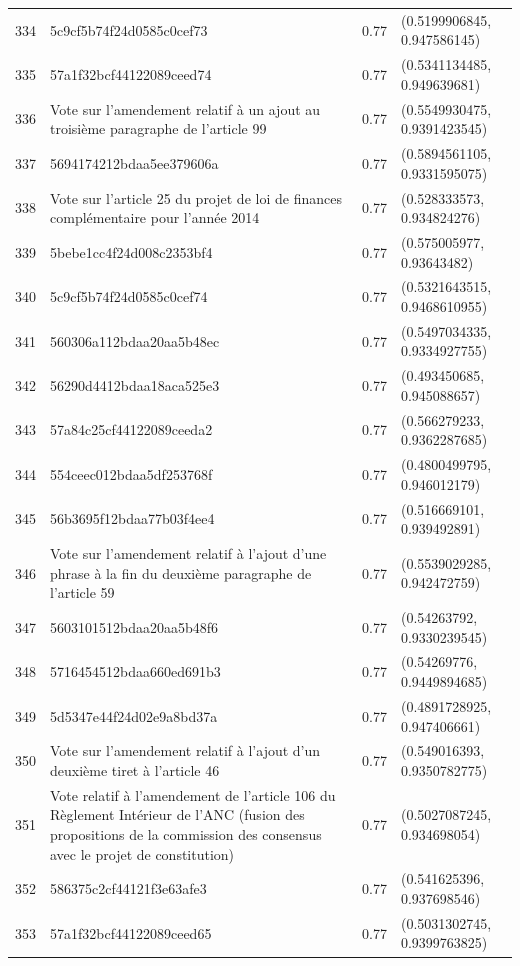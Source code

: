 \begin{table}[ht]
\begin{tabular}{rlrl}
  334 & 5c9cf5b74f24d0585c0cef73 & 0.77 & (0.5199906845, 0.947586145) \\ 
  335 & 57a1f32bcf44122089ceed74 & 0.77 & (0.5341134485, 0.949639681) \\ 
  336 & Vote sur l'amendement relatif à un ajout au troisième paragraphe de l'article 99 & 0.77 & (0.5549930475, 0.9391423545) \\ 
  337 & 5694174212bdaa5ee379606a & 0.77 & (0.5894561105, 0.9331595075) \\ 
  338 & Vote sur l'article 25 du projet de loi de finances complémentaire pour l'année 2014 & 0.77 & (0.528333573, 0.934824276) \\ 
  339 & 5bebe1cc4f24d008c2353bf4 & 0.77 & (0.575005977, 0.93643482) \\ 
  340 & 5c9cf5b74f24d0585c0cef74 & 0.77 & (0.5321643515, 0.9468610955) \\ 
  341 & 560306a112bdaa20aa5b48ec & 0.77 & (0.5497034335, 0.9334927755) \\ 
  342 & 56290d4412bdaa18aca525e3 & 0.77 & (0.493450685, 0.945088657) \\ 
  343 & 57a84c25cf44122089ceeda2 & 0.77 & (0.566279233, 0.9362287685) \\ 
  344 & 554ceec012bdaa5df253768f & 0.77 & (0.4800499795, 0.946012179) \\ 
  345 & 56b3695f12bdaa77b03f4ee4 & 0.77 & (0.516669101, 0.939492891) \\ 
  346 & Vote sur l'amendement relatif à l'ajout d'une phrase à la fin du deuxième paragraphe de l'article 59 & 0.77 & (0.5539029285, 0.942472759) \\ 
  347 & 5603101512bdaa20aa5b48f6 & 0.77 & (0.54263792, 0.9330239545) \\ 
  348 & 5716454512bdaa660ed691b3 & 0.77 & (0.54269776, 0.9449894685) \\ 
  349 & 5d5347e44f24d02e9a8bd37a & 0.77 & (0.4891728925, 0.947406661) \\ 
  350 & Vote sur l'amendement relatif à l'ajout d'un deuxième tiret à l'article 46 & 0.77 & (0.549016393, 0.9350782775) \\ 
  351 & Vote relatif à l'amendement de l'article 106 du Règlement Intérieur de l'ANC (fusion des propositions de la commission des consensus avec le projet de constitution) & 0.77 & (0.5027087245, 0.934698054) \\ 
  352 & 586375c2cf44121f3e63afe3 & 0.77 & (0.541625396, 0.937698546) \\ 
  353 & 57a1f32bcf44122089ceed65 & 0.77 & (0.5031302745, 0.9399763825) \\ 

\end{tabular}
\end{table}
